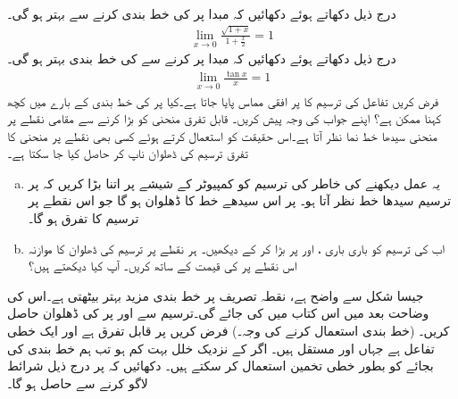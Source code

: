 \\
درج ذیل دکھاتے ہوئے دکھائیں کہ مبدا پر  کی  خط بندی  کرنے سے بہتر ہو گی۔
\begin{align*}
\lim_{x\to0}\frac{\sqrt{1+x}}{1+\tfrac{x}{2}}=1
\end{align*}
درج ذیل دکھاتے ہوئے دکھائیں کہ مبدا پر  کرنے سے  کی خط بندی بہتر ہو گی۔
\begin{align*}
\lim_{x\to 0}\frac{\tan x}{x}=1
\end{align*}
فرض کریں تفاعل  کی ترسیم کا  پر افقی مماس پایا جاتا ہے۔کیا  پر  کی خط بندی کے بارے میں کچھ کہنا ممکن ہے؟ اپنے جواب کی وجہ پیش کریں۔
\quad
قابل تفرق منحنی کو بڑا کرنے سے  مقامی نقطے پر منحنی سیدھا خط نما نظر آتا ہے۔اس حقیقت کو استعمال کرتے ہوئے کسی بھی نقطے پر منحنی کا تفرق ترسیم کی ڈھلوان ناپ کر حاصل کیا جا سکتا ہے۔ 
\begin{enumerate}[a.]
\item
یہ عمل دیکھنے کی خاطر  کی ترسیم کو کمپیوٹر کے شیشے پر  اتنا بڑا کریں کہ  پر ترسیم سیدھا خط نظر آتا ہو۔  پر اس سیدھے خط کا ڈھلوان  ہو گا جو اس نقطے پر ترسیم کا تفرق ہو گا۔
\item
اب  کی ترسیم کو باری باری ،  اور  پر بڑا کر کے دیکھیں۔ ہر نقطے پر ترسیم کی ڈھلوان کا موازنہ اس نقطے پر  کی قیمت کے ساتھ کریں۔ آپ کیا دیکھتے ہیں؟
\end{enumerate}
\quad
جیسا شکل  سے واضح ہے، نقطہ تصریف پر خط بندی مزید بہتر بیٹھتی ہے۔اس کی وضاحت  بعد میں اس کتاب میں کی جائے گی۔ترسیم سے  اور  پر  کی ڈھلوان حاصل کریں۔
 (خط بندی استعمال کرنے کی وجہ۔)\quad
فرض کریں  پر  قابل تفرق ہے اور  ایک خطی تفاعل ہے جہاں  اور  مستقل ہیں۔ اگر  کے نزدیک خلل  بہت کم ہو تب ہم خط بندی  کی بجائے  کو بطور خطی تخمین استعمال کر سکتے ہیں۔ دکھائیں کہ   پر درج ذیل شرائط لاگو کرنے سے  حاصل ہو گا۔

